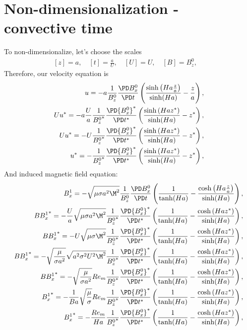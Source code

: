 \documentclass[11pt]{article}
\begin{document}
\section{Non-dimensionalization - convective time}
To non-dimensionalize, let's choose the scales
\begin{equation}\begin{aligned}
[z] = a,  \quad
[t] = \frac{a}{U},  \quad
[U] = U,  \quad
[B] = B_z^0,  \quad
\end{aligned} \end{equation}
Therefore, our velocity equation is
\begin{equation}\begin{aligned}
u   = -a \frac{1}{B_z^0} \frac{\PD B_x^0}{\PD t} \left( \frac{\sinh\left(Ha \frac{z}{a} \right)}{\sinh(Ha)} - \frac{z}{a} \right), \\
U u^*   = -a \frac{U}{a} \frac{1}{{B_z^0}^*} \frac{\PD {B_x^0}^*}{\PD t^*} \left( \frac{\sinh\left(Ha z^* \right)}{\sinh(Ha)} - z^* \right), \\
U u^*   = -U \frac{1}{{B_z^0}^*} \frac{\PD {B_x^0}^*}{\PD t^*} \left( \frac{\sinh\left(Ha z^* \right)}{\sinh(Ha)} - z^* \right), \\
u^*     = - \frac{1}{{B_z^0}^*} \frac{\PD {B_x^0}^*}{\PD t^*} \left( \frac{\sinh\left(Ha z^* \right)}{\sinh(Ha)} - z^* \right), \\
\end{aligned} \end{equation}
And induced magnetic field equation:
\begin{equation}\begin{aligned}
B_x^1 = - \sqrt{\mu \sigma a^2 \M^2} \frac{1}{B_z^0} \frac{\PD B_x^0}{\PD t} \left( \frac{1}{\tanh(Ha)} -  \frac{\cosh \left(Ha \frac{z}{a} \right)}{\sinh(Ha)}\right), \\
B {B_x^1}^* = - \frac{U}{a} \sqrt{\mu \sigma a^2 \M^2} \frac{1}{{B_z^0}^*} \frac{\PD {B_x^0}^*}{\PD t^*} \left( \frac{1}{\tanh(Ha)} -  \frac{\cosh \left(Ha z^* \right)}{\sinh(Ha)}\right), \\
B {B_x^1}^* = - U \sqrt{\mu \sigma \M^2} \frac{1}{{B_z^0}^*} \frac{\PD {B_x^0}^*}{\PD t^*} \left( \frac{1}{\tanh(Ha)} -  \frac{\cosh \left(Ha z^* \right)}{\sinh(Ha)}\right), \\
B {B_x^1}^* = - \sqrt{\frac{\mu}{\sigma a^2} }\sqrt{a^2 \sigma^2 U^2 \M^2} \frac{1}{{B_z^0}^*} \frac{\PD {B_x^0}^*}{\PD t^*} \left( \frac{1}{\tanh(Ha)} -  \frac{\cosh \left(Ha z^* \right)}{\sinh(Ha)}\right), \\
B {B_x^1}^* = - \sqrt{\frac{\mu}{\sigma a^2} }Re_m \frac{1}{{B_z^0}^*} \frac{\PD {B_x^0}^*}{\PD t^*} \left( \frac{1}{\tanh(Ha)} -  \frac{\cosh \left(Ha z^* \right)}{\sinh(Ha)}\right), \\
{B_x^1}^* = - \frac{1}{B a} \sqrt{\frac{\mu}{\sigma} }Re_m \frac{1}{{B_z^0}^*} \frac{\PD {B_x^0}^*}{\PD t^*} \left( \frac{1}{\tanh(Ha)} -  \frac{\cosh \left(Ha z^* \right)}{\sinh(Ha)}\right), \\
{B_x^1}^* = - \frac{Re_m}{Ha} \frac{1}{{B_z^0}^*} \frac{\PD {B_x^0}^*}{\PD t^*} \left( \frac{1}{\tanh(Ha)} -  \frac{\cosh \left(Ha z^* \right)}{\sinh(Ha)}\right), \\
\end{aligned} \end{equation}
\end{document}
